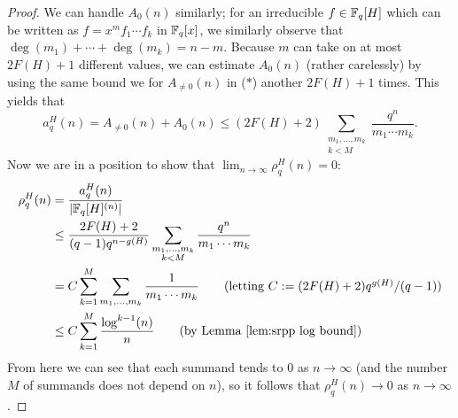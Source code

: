 \begin{proof}
	We can handle $A_0(n)$ similarly; for an irreducible $f\in \mathbb{F}_q[H]$ which can be written as $f= x^m f_1\cdots f_k$ in $\mathbb{F}_q[x]$, we similarly observe that $\deg(m_1)+\cdots+\deg(m_k) = n-m$. 
	Because $m$ can take on at most $2F(H)+1$ different values, we can estimate $A_0(n)$ (rather carelessly) by using the same bound we for $A_{\neq0}(n)$ in ($*$) another $2F(H)+1$ times.
	This yields that
	\[a_q^H(n) = A_{\neq0}(n) + A_0(n) \le (2F(H)+2) \sum_{\substack{m_1,\dots,m_k \\ k < M}} \frac{q^n}{m_1\cdots m_k}. \]
	Now we are in a position to show that $\lim_{n\to\infty}\rho_q^H(n) = 0$:
	\begin{align*}
	\rho_q^H(n) 
	&= \frac{a_q^H(n)}{|\Fq[H]^{(n)}|} \\
	&\le \frac{2F(H)+2}{(q-1)q^{n-g(H)}} \sum_{\substack{m_1,\dots,m_k \\ k<M}} \frac{q^n}{m_1\cdots m_k} \\
	&=C \sum_{k=1}^M \sum_{m_1,\dots,m_k} \frac{1}{m_1\cdots m_k} \tag{letting $C := (2F(H)+2)q^{g(H)}/(q-1)$}\\
	&\le C \sum_{k=1}^M \frac{\log^{k-1}(n)}{n} \tag{by Lemma \ref{lem:srpp log bound}} \\
	\end{align*}
	From here we can see that each summand tends to $0$ as $n\to\infty$ (and the number $M$ of summands does not depend on $n$), so it follows that $\rho_q^H(n) \to 0$ as $n\to \infty$.
\end{proof}